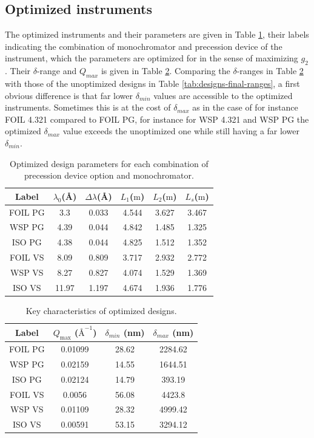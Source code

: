 \documentclass{article}
\begin{document}
\subsection{Optimized instruments}
The optimized instruments and their parameters are given in Table \ref{tab:optimized-designs}, their labels indicating the combination of monochromator and precession device of the instrument, which the parameters are optimized for in the sense of maximizing $g_2$. Their $\delta$-range and $Q_{max}$ is given in Table \ref{tab:optimized-designs-performance}. Comparing the $\delta$-ranges in Table \ref{tab:optimized-designs-performance} with those of the unoptimized designs in Table \ref{tab:designs-final-ranges}, a first obvious difference is that far lower $\delta_{min}$ values are accessible to the optimized instruments. Sometimes this is at the cost of $\delta_{max}$ as in the case of for instance FOIL 4.321 compared to FOIL PG, for instance for WSP 4.321 and WSP PG the optimized $\delta_{max}$ value exceeds the unoptimized one while still having a far lower $\delta_{min}$.
\begin{table}[h!]
	\centering
	\begin{tabular}{c c c c c c}
		\toprule
		Label & $\lambda_0$(Å) & $\Delta\lambda$(Å) & $L_1$($\unit{\meter}$) & $L_2$($\unit{\meter}$) & $L_s$($\unit{\meter}$) \\
		\midrule
		FOIL PG & 3.3 & 0.033 & 4.544 & 3.627 & 3.467 \\
		WSP PG & 4.39 & 0.044 & 4.842 & 1.485 & 1.325 \\
		ISO PG & 4.38 & 0.044 & 4.825 & 1.512 & 1.352 \\
		FOIL VS & 8.09 & 0.809 & 3.717 & 2.932 & 2.772 \\
		WSP VS & 8.27 & 0.827 & 4.074 & 1.529 & 1.369 \\
		ISO VS & 11.97 & 1.197 & 4.674 & 1.936 & 1.776 \\
		\bottomrule
	\end{tabular}
	\caption{Optimized design parameters for each combination of precession device option and monochromator. }
	\label{tab:optimized-designs}
\end{table}
\begin{table}[h!]
	\centering
	\begin{tabular}{c c c c}
		\toprule
		Label & $Q_{\text{max}}$ ($\text{\AA}^{-1}$) & $\delta_{min}$ (nm) & $\delta_{max}$ (nm) \\
		\midrule
		FOIL PG & 0.01099 & 28.62 & 2284.62 \\
		WSP PG & 0.02159 & 14.55 & 1644.51 \\
		ISO PG & 0.02124 & 14.79 & 393.19 \\
		FOIL VS & 0.0056 & 56.08 & 4423.8 \\
		WSP VS & 0.01109 & 28.32 & 4999.42 \\
		ISO VS & 0.00591 & 53.15 & 3294.12 \\
		\bottomrule
	\end{tabular}
	\caption{Key characteristics of optimized designs.}
	\label{tab:optimized-designs-performance}
\end{table}
\end{document}
